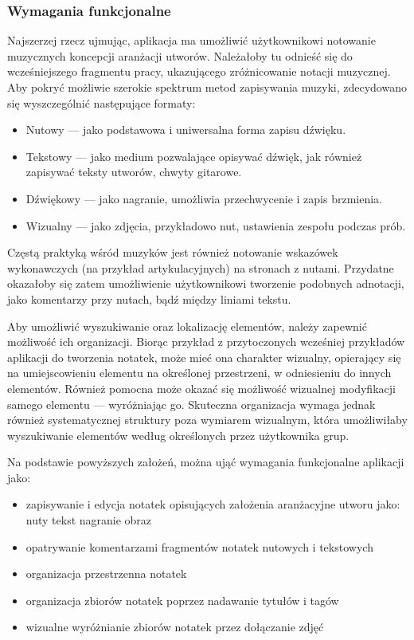 \subsubsection{Wymagania funkcjonalne}
Najszerzej rzecz ujmując, aplikacja ma umożliwić użytkownikowi notowanie muzycznych koncepcji aranżacji utworów.
Należałoby tu odnieść się do wcześniejszego fragmentu pracy, ukazującego zróżnicowanie notacji muzycznej.
Aby pokryć możliwie szerokie spektrum metod zapisywania muzyki, zdecydowano się wyszczególnić następujące formaty:
\begin{itemize}
	\item Nutowy — jako podstawowa i uniwersalna forma zapisu dźwięku.
	\item Tekstowy — jako medium pozwalające opisywać dźwięk, jak również zapisywać teksty utworów, chwyty gitarowe.
	\item Dźwiękowy — jako nagranie, umożliwia przechwycenie i zapis brzmienia.
	\item Wizualny — jako zdjęcia, przykładowo nut, ustawienia zespołu podczas prób.
\end{itemize}

Częstą praktyką wśród muzyków jest również notowanie wskazówek wykonawczych (na przykład artykulacyjnych)
na stronach z nutami.
Przydatne okazałoby się zatem umożliwienie użytkownikowi tworzenie podobnych adnotacji, jako komentarzy przy nutach,
bądź między liniami tekstu.

Aby umożliwić wyszukiwanie oraz lokalizację elementów, należy zapewnić możliwość ich organizacji.
Biorąc przykład z przytoczonych wcześniej przykładów aplikacji do tworzenia notatek, może mieć ona charakter wizualny,
opierający się na umiejscowieniu elementu na określonej przestrzeni, w odniesieniu do innych elementów.
Również pomocna może okazać się możliwość wizualnej modyfikacji samego elementu — wyróżniając go.
Skuteczna organizacja wymaga jednak również systematycznej struktury poza wymiarem wizualnym, która umożliwiłaby wyszukiwanie
elementów według określonych przez użytkownika grup.

Na podstawie powyższych założeń, można ująć wymagania funkcjonalne aplikacji jako:
\begin{itemize}
	\item zapisywanie i edycja notatek opisujących założenia aranżacyjne utworu jako:
	      \subitem nuty
	      \subitem tekst
	      \subitem nagranie
	      \subitem obraz
	\item opatrywanie komentarzami fragmentów notatek nutowych i tekstowych
	\item organizacja przestrzenna notatek
	\item organizacja zbiorów notatek poprzez nadawanie tytułów i tagów
	\item wizualne wyróżnianie zbiorów notatek przez dołączanie zdjęć
\end{itemize}

